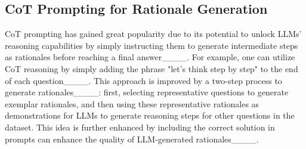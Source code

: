 
\subsection{CoT Prompting for Rationale Generation}

CoT prompting has gained great popularity due to its potential to unlock LLMs' reasoning capabilities by simply instructing them to generate intermediate steps as rationales before reaching a final answer____. For example, one can utilize CoT reasoning by simply adding the phrase "let's think step by step" to the end of each question____. This approach is improved by a two-step process to generate rationales____: first, selecting representative questions to generate exemplar rationales, and then using these representative rationales as demonstrations for LLMs to generate reasoning steps for other questions in the dataset. This idea is further enhanced by including the correct solution in prompts can enhance the quality of LLM-generated rationales____. 
 

